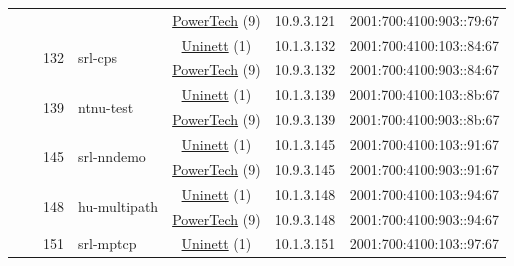 \begin{small}
\begin{center}
\begin{longtable}{|c|c|c|c|c|c|c|c|}
  &  &  &  & \multicolumn{2}{|c|}{\tiny{\href{http://www.powertech.no}{PowerTech} (9)}} & \tiny{10.9.3.121} & \tiny{2001:700:4100:903::79:67} \\* \cline{3-3}\cline{4-4}\cline{5-5}\cline{6-6}\cline{7-7}\cline{8-8}
  &  & \multirow{2}{*}{\tiny{132}} & \multicolumn{1}{|l|}{\multirow{2}{*}{\tiny{srl-cps}}} & \multicolumn{2}{|c|}{\tiny{\href{https://www.uninett.no}{Uninett} (1)}} & \tiny{10.1.3.132} & \tiny{2001:700:4100:103::84:67} \\* \cline{5-5}\cline{6-6}\cline{7-7}\cline{8-8}
  &  &  &  & \multicolumn{2}{|c|}{\tiny{\href{http://www.powertech.no}{PowerTech} (9)}} & \tiny{10.9.3.132} & \tiny{2001:700:4100:903::84:67} \\* \cline{3-3}\cline{4-4}\cline{5-5}\cline{6-6}\cline{7-7}\cline{8-8}
  &  & \multirow{2}{*}{\tiny{139}} & \multicolumn{1}{|l|}{\multirow{2}{*}{\tiny{ntnu-test}}} & \multicolumn{2}{|c|}{\tiny{\href{https://www.uninett.no}{Uninett} (1)}} & \tiny{10.1.3.139} & \tiny{2001:700:4100:103::8b:67} \\* \cline{5-5}\cline{6-6}\cline{7-7}\cline{8-8}
  &  &  &  & \multicolumn{2}{|c|}{\tiny{\href{http://www.powertech.no}{PowerTech} (9)}} & \tiny{10.9.3.139} & \tiny{2001:700:4100:903::8b:67} \\* \cline{3-3}\cline{4-4}\cline{5-5}\cline{6-6}\cline{7-7}\cline{8-8}
  &  & \multirow{2}{*}{\tiny{145}} & \multicolumn{1}{|l|}{\multirow{2}{*}{\tiny{srl-nndemo}}} & \multicolumn{2}{|c|}{\tiny{\href{https://www.uninett.no}{Uninett} (1)}} & \tiny{10.1.3.145} & \tiny{2001:700:4100:103::91:67} \\* \cline{5-5}\cline{6-6}\cline{7-7}\cline{8-8}
  &  &  &  & \multicolumn{2}{|c|}{\tiny{\href{http://www.powertech.no}{PowerTech} (9)}} & \tiny{10.9.3.145} & \tiny{2001:700:4100:903::91:67} \\* \cline{3-3}\cline{4-4}\cline{5-5}\cline{6-6}\cline{7-7}\cline{8-8}
  &  & \multirow{2}{*}{\tiny{148}} & \multicolumn{1}{|l|}{\multirow{2}{*}{\tiny{hu-multipath}}} & \multicolumn{2}{|c|}{\tiny{\href{https://www.uninett.no}{Uninett} (1)}} & \tiny{10.1.3.148} & \tiny{2001:700:4100:103::94:67} \\* \cline{5-5}\cline{6-6}\cline{7-7}\cline{8-8}
  &  &  &  & \multicolumn{2}{|c|}{\tiny{\href{http://www.powertech.no}{PowerTech} (9)}} & \tiny{10.9.3.148} & \tiny{2001:700:4100:903::94:67} \\* \cline{3-3}\cline{4-4}\cline{5-5}\cline{6-6}\cline{7-7}\cline{8-8}
  &  & \multirow{2}{*}{\tiny{151}} & \multicolumn{1}{|l|}{\multirow{2}{*}{\tiny{srl-mptcp}}} & \multicolumn{2}{|c|}{\tiny{\href{https://www.uninett.no}{Uninett} (1)}} & \tiny{10.1.3.151} & \tiny{2001:700:4100:103::97:67} \\* \cline{5-5}\cline{6-6}\cline{7-7}\cline{8-8}

\end{longtable}
\end{center}
\end{small}
